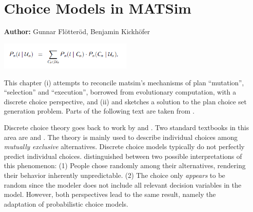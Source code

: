 \chapter{Choice Models in MATSim}
\label{ch:discretechoice}

\hfill \textbf{Author:} Gunnar Flötteröd, Benjamin Kickhöfer


\begin{center} \includegraphics[width=0.5\textwidth, angle=0]{understanding/figures/dc.png} \end{center}

This chapter (i) attempts to reconcile \gls{matsim}'s mechanisms of plan
{}``mutation'', {}``selection'' and {}``execution'', borrowed from evolutionary computation, with a 
discrete choice perspective, and (ii) and sketches a solution to the
plan choice set generation problem. Parts of the following text are taken from \citet[][Section~2.3]{Kickhoefer_PhDThesis_2014}.

Discrete choice theory goes back to work by \citet{Luce1965PreferenceUtility} and 
\citet{McFadden1975DiscreteChoiceModel}. Two standard textbooks in this area are 
\citet{Ben-AkivaBook} and \citet{Train_2003}. The theory is mainly used 
to describe individual choices among \emph{mutually exclusive} alternatives. 
Discrete choice models typically do not perfectly predict individual choices.
\citet{Luce1965PreferenceUtility} distinguished between two possible interpretations of this phenomenon:
(1) People chose randomly among their alternatives, rendering their behavior inherently unpredictable.
(2) The choice only \emph{appears} to be random since the modeler does not include all relevant 
decision variables in the model. However, both perspectives lead to the same result, namely the adaptation
of probabilistic choice models.

